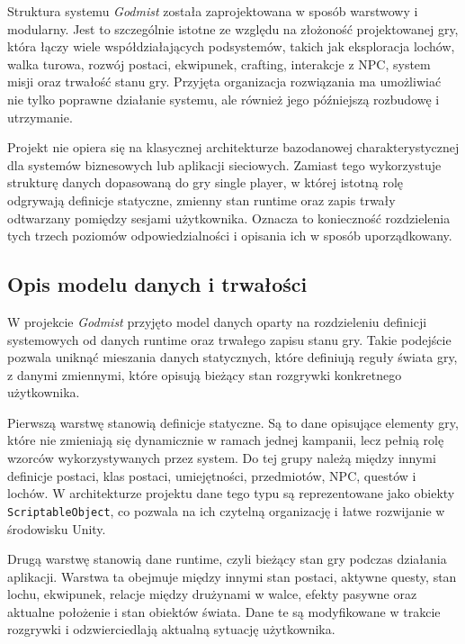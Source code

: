 Struktura systemu \emph{Godmist} została zaprojektowana w sposób warstwowy i modularny. Jest to szczególnie istotne ze względu na złożoność projektowanej gry, która łączy wiele współdziałających podsystemów, takich jak eksploracja lochów, walka turowa, rozwój postaci, ekwipunek, crafting, interakcje z NPC, system misji oraz trwałość stanu gry. Przyjęta organizacja rozwiązania ma umożliwiać nie tylko poprawne działanie systemu, ale również jego późniejszą rozbudowę i utrzymanie.

Projekt nie opiera się na klasycznej architekturze bazodanowej charakterystycznej dla systemów biznesowych lub aplikacji sieciowych. Zamiast tego wykorzystuje strukturę danych dopasowaną do gry single player, w której istotną rolę odgrywają definicje statyczne, zmienny stan runtime oraz zapis trwały odtwarzany pomiędzy sesjami użytkownika. Oznacza to konieczność rozdzielenia tych trzech poziomów odpowiedzialności i opisania ich w sposób uporządkowany.

\subsection{Opis modelu danych i trwałości}
\label{subsec:opis-modelu-danych}

W projekcie \emph{Godmist} przyjęto model danych oparty na rozdzieleniu definicji systemowych od danych runtime oraz trwałego zapisu stanu gry. Takie podejście pozwala uniknąć mieszania danych statycznych, które definiują reguły świata gry, z danymi zmiennymi, które opisują bieżący stan rozgrywki konkretnego użytkownika.

Pierwszą warstwę stanowią definicje statyczne. Są to dane opisujące elementy gry, które nie zmieniają się dynamicznie w ramach jednej kampanii, lecz pełnią rolę wzorców wykorzystywanych przez system. Do tej grupy należą między innymi definicje postaci, klas postaci, umiejętności, przedmiotów, NPC, questów i lochów. W architekturze projektu dane tego typu są reprezentowane jako obiekty \texttt{ScriptableObject}, co pozwala na ich czytelną organizację i łatwe rozwijanie w środowisku Unity.

Drugą warstwę stanowią dane runtime, czyli bieżący stan gry podczas działania aplikacji. Warstwa ta obejmuje między innymi stan postaci, aktywne questy, stan lochu, ekwipunek, relacje między drużynami w walce, efekty pasywne oraz aktualne położenie i stan obiektów świata. Dane te są modyfikowane w trakcie rozgrywki i odzwierciedlają aktualną sytuację użytkownika.

